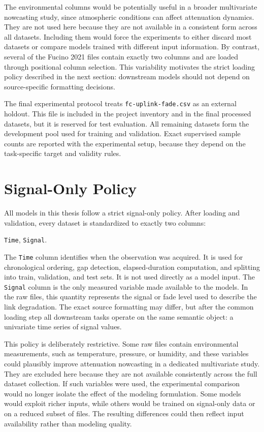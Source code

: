 The environmental columns would be potentially useful in a broader
multivariate nowcasting study, since atmospheric conditions can affect
attenuation dynamics. They are not used here because they are not available in a
consistent form across all datasets. Including them would force the experiments
to either discard most datasets or compare models trained with different input
information. By contrast, several of the Fucino 2021 files contain exactly two
columns and are loaded through positional column selection. This variability
motivates the strict loading policy described in the next section: downstream
models should not depend on source-specific formatting decisions.

The final experimental protocol treats \texttt{fc-uplink-fade.csv} as an
external holdout. This file is included in the project inventory and in the
final processed datasets, but it is reserved for test evaluation. All remaining
datasets form the development pool used for training and validation. Exact
supervised sample counts are reported with the experimental setup, because they
depend on the task-specific target and validity rules.

\section{Signal-Only Policy}

All models in this thesis follow a strict signal-only policy. After loading and
validation, every dataset is standardized to exactly two columns:

\begin{center}
\texttt{Time}, \texttt{Signal}.
\end{center}

The \texttt{Time} column identifies when the observation was acquired. It is
used for chronological ordering, gap detection, elapsed-duration computation,
and splitting into train, validation, and test sets. It is not used directly as
a model input.
The \texttt{Signal} column is the only measured variable made available to the
models. In the raw files, this quantity represents the signal or fade level
used to describe the link degradation. The exact source formatting may differ,
but after the common loading step all downstream tasks operate on the same
semantic object: a univariate time series of signal values.

This policy is deliberately restrictive. Some raw files contain environmental
measurements, such as temperature, pressure, or humidity, and these variables
could plausibly improve attenuation nowcasting in a dedicated multivariate
study. They are excluded here because they are not available consistently
across the full dataset collection. If such variables were used, the
experimental comparison would no longer isolate the effect of the modeling
formulation. Some models would exploit richer inputs, while others would be
trained on signal-only data or on a reduced subset of files. The resulting
differences could then reflect input availability rather than modeling
quality.

